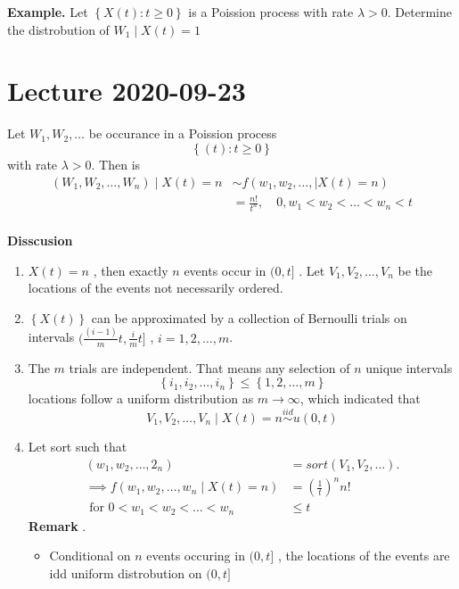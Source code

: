 \documentclass{article}
\theoremstyle{remark}
\begin{document}
\begin{tcolorbox}
  \textbf{Example.} Let $\left\{ X\left( t \right): t \ge 0 \right\}$ is a Poission process with rate $\lambda > 0$. Determine the distrobution of $W_{1}  \mid  X\left( t  \right) = 1$
\end{tcolorbox}

\newpage
\section{Lecture 2020-09-23}%
\label{sec:lecture_2020_09_23}



\begin{theorem}
  Let $W_{1}, W_{2} , \ldots$ be occurance in a Poission process \[
  \left\{ \left( t \right) : t \ge 0\right\}
  \] 
  with rate $\lambda  > 0$. Then is \[
    \begin{split}
  \left( W_{1}, W_{2}, \ldots, W_{n} \right)  \mid  X\left( t \right)   = n   & \sim f\left( w_{1}, w_{2}, \ldots,  \mid  X\left( t \right) = n \right) \\
  &= \frac{n!}{t^{n} } , \quad  0, w_{1} < w_{2} < \ldots<   w_{n} < t   \\
    \end{split} 
  \] 
\end{theorem}
\textbf{Disscusion}  
\begin{enumerate}[label=(\roman*)]
  \item $X\left( t \right) = n$ , then exactly $n$ events occur in $(0,t]$ . Let  $V_{1}, V_{2}, \ldots , V_{n}$ be the locations of the events not necessarily ordered. 
\item $\left\{ X\left( t \right) \right\}$ can be approximated by a collection of Bernoulli trials on intervals $(  \frac{\left( i-1 \right)}{m} t, \frac{i}{m} t  ]$ , $i = 1, 2 , \ldots , m$. 
\item The $m$ trials are independent. That means any selection of $n$ unique intervals \[
\left\{ i_{1}, i_{2}, \ldots, i_{n} \right\} \le \left\{ 1,2,\ldots, m \right\}
\] 
locations follow a uniform distribution as $m \to  \infty$, which indicated that \[
V_{1}, V_{2}, \ldots, V_{n}  \mid  X\left( t \right) =n  \stackrel{iid}{\sim } u\left( 0,t \right) 
\] 
\item Let sort such that \[
    \begin{split}
\left( w_{1} , w_{2} , \ldots, 2_{n} \right)  & = sort\left( V_{1}, V_{2} , \ldots \right). \\
\implies  f\left( w_{1}, w_{2}, \ldots , w_{n}  \mid X\left( t \right) = n \right) &=  \left( \frac{1}{t} \right)^{n} n! \\
   \text{ for } 0< w_{1} < w_{2} < \ldots < w_{n}  & \le t
    \end{split} 
\] 
\textbf{Remark} . 
\begin{itemize}
  \item Conditional on $n$ events occuring in $(0, t]$ ,  the locations of the events are idd uniform distrobution on  $(0,t]$
\end{itemize}
\end{enumerate}
\end{document}
